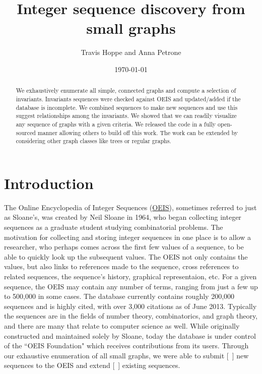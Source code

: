 \documentclass[12pt]{article}
\begin{document}
\setlength{\parindent}{0cm}

\title{Integer sequence discovery from small graphs}
\author{Travis Hoppe and Anna Petrone}
\date{\today}
\maketitle

\begin{abstract}
We exhaustively enumerate all simple, connected graphs and compute a selection of invariants. 
Invariants sequences were checked against OEIS and updated/added if the database is incomplete.
We combined sequences to make new sequences and use this suggest relationships among the invariants.
We showed that we can readily visualize any sequence of graphs with a given criteria.
We released the code in a fully open-sourced manner allowing others to build off this work.
The work can be extended by considering other graph classes like trees or regular graphs.
\end{abstract}

\section{Introduction}

The Online Encyclopedia of Integer Sequences (\href{https://oeis.org/}{OEIS}), sometimes referred to just as Sloane's, was created by Neil Sloane in 1964, who began collecting integer sequences as a graduate student studying combinatorial problems. The motivation for collecting and storing integer sequences in one place is to allow a researcher, who perhaps comes across the first few values of a sequence, to be able to quickly look up the subsequent values. The OEIS not only contains the values, but also links to references made to the sequence, cross references to related sequences, the sequence's history, graphical representaion, etc. For a given sequence, the OEIS may contain any number of terms, ranging from just a few up to 500,000 in some cases. The database currently contains roughly 200,000 sequences and is highly cited, with over 3,000 citations as of June 2013. Typically the sequences are in the fields of number theory, combinatorics, and graph theory, and there are many that relate to computer science as well. While originally constructed and maintained solely by Sloane, today the database is under control of the ``OEIS Foundation" which receives contributions from its users. Through our exhaustive enumeration of all small graphs, we were able to submit [\ ] new sequences to the OEIS and extend [\ ] existing sequences. \\
\end{document}
